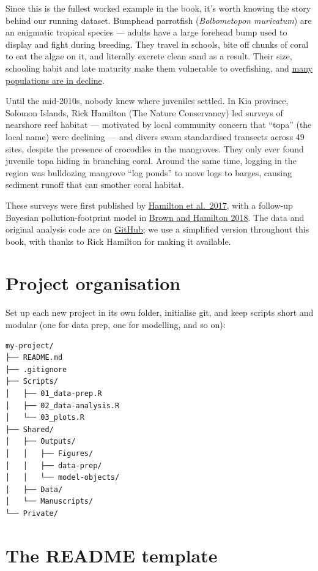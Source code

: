 \documentclass[
  letterpaper,
  DIV=11,
  numbers=noendperiod]{scrreprt}
\begin{document}
Since this is the fullest worked example in the book, it's worth knowing
the story behind our running dataset. Bumphead parrotfish
(\emph{Bolbometopon muricatum}) are an enigmatic tropical species ---
adults have a large forehead bump used to display and fight during
breeding. They travel in schools, bite off chunks of coral to eat the
algae on it, and literally excrete clean sand as a result. Their size,
schooling habit and late maturity make them vulnerable to overfishing,
and \href{https://doi.org/10.1007/s00338-019-01801-z}{many populations
are in decline}.

Until the mid-2010s, nobody knew where juveniles settled. In Kia
province, Solomon Islands, Rick Hamilton (The Nature Conservancy) led
surveys of nearshore reef habitat --- motivated by local community
concern that ``topa'' (the local name) were declining --- and divers
swam standardised transects across 49 sites, despite the presence of
crocodiles in the mangroves. They only ever found juvenile topa hiding
in branching coral. Around the same time, logging in the region was
bulldozing mangrove ``log ponds'' to move logs to barges, causing
sediment runoff that can smother coral habitat.

These surveys were first published by
\href{http://dx.doi.org/10.1016/j.biocon.2017.04.024}{Hamilton et
al.~2017}, with a follow-up Bayesian pollution-footprint model in
\href{http://dx.doi.org/10.1111/cobi.13079}{Brown and Hamilton 2018}.
The data and original analysis code are on
\href{https://github.com/cbrown5/BenthicLatent}{GitHub}; we use a
simplified version throughout this book, with thanks to Rick Hamilton
for making it available.

\section{Project organisation}\label{project-organisation}

Set up each new project in its own folder, initialise git, and keep
scripts short and modular (one for data prep, one for modelling, and so
on):

\begin{verbatim}
my-project/
├── README.md
├── .gitignore
├── Scripts/
│   ├── 01_data-prep.R
│   ├── 02_data-analysis.R
│   └── 03_plots.R
├── Shared/
│   ├── Outputs/
│   │   ├── Figures/
│   │   ├── data-prep/
│   │   └── model-objects/
│   ├── Data/
│   └── Manuscripts/
└── Private/
\end{verbatim}

\section{The README template}\label{the-readme-template}
\end{document}
